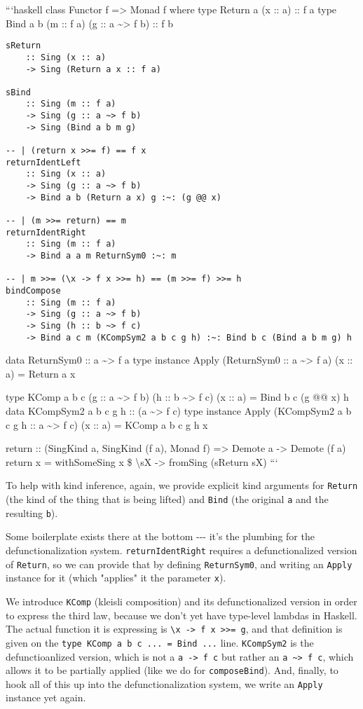 \documentclass[]{article}
\begin{document}
```haskell class Functor f =\textgreater{} Monad f where type Return a (x :: a)
:: f a type Bind a b (m :: f a) (g :: a \textasciitilde{}\textgreater{} f b) ::
f b

\begin{verbatim}
sReturn
    :: Sing (x :: a)
    -> Sing (Return a x :: f a)

sBind
    :: Sing (m :: f a)
    -> Sing (g :: a ~> f b)
    -> Sing (Bind a b m g)

-- | (return x >>= f) == f x
returnIdentLeft
    :: Sing (x :: a)
    -> Sing (g :: a ~> f b)
    -> Bind a b (Return a x) g :~: (g @@ x)

-- | (m >>= return) == m
returnIdentRight
    :: Sing (m :: f a)
    -> Bind a a m ReturnSym0 :~: m

-- | m >>= (\x -> f x >>= h) == (m >>= f) >>= h
bindCompose
    :: Sing (m :: f a)
    -> Sing (g :: a ~> f b)
    -> Sing (h :: b ~> f c)
    -> Bind a c m (KCompSym2 a b c g h) :~: Bind b c (Bind a b m g) h
\end{verbatim}

data ReturnSym0 :: a \textasciitilde{}\textgreater{} f a type instance Apply
(ReturnSym0 :: a \textasciitilde{}\textgreater{} f a) (x :: a) = Return a x

type KComp a b c (g :: a \textasciitilde{}\textgreater{} f b) (h :: b
\textasciitilde{}\textgreater{} f c) (x :: a) = Bind b c (g @@ x) h data
KCompSym2 a b c g h :: (a \textasciitilde{}\textgreater{} f c) type instance
Apply (KCompSym2 a b c g h :: a \textasciitilde{}\textgreater{} f c) (x :: a) =
KComp a b c g h x

return :: (SingKind a, SingKind (f a), Monad f) =\textgreater{} Demote a
-\textgreater{} Demote (f a) return x = withSomeSing x \$ \textbackslash{}sX
-\textgreater{} fromSing (sReturn sX) ```

To help with kind inference, again, we provide explicit kind arguments for
\texttt{Return} (the kind of the thing that is being lifted) and \texttt{Bind}
(the original \texttt{a} and the resulting \texttt{b}).

Some boilerplate exists there at the bottom -\/-\/- it's the plumbing for the
defunctionalization system. \texttt{returnIdentRight} requires a
defunctionalized version of \texttt{Return}, so we can provide that by defining
\texttt{ReturnSym0}, and writing an \texttt{Apply} instance for it (which
"applies" it the parameter \texttt{x}).

We introduce \texttt{KComp} (kleisli composition) and its defunctionalized
version in order to express the third law, because we don't yet have type-level
lambdas in Haskell. The actual function it is expressing is
\texttt{\textbackslash{}x\ -\textgreater{}\ f\ x\ \textgreater{}\textgreater{}=\ g},
and that definition is given on the
\texttt{type\ KComp\ a\ b\ c\ ...\ =\ Bind\ ...} line. \texttt{KCompSym2} is the
defunctioanlized version, which is not a \texttt{a\ -\textgreater{}\ f\ c} but
rather an \texttt{a\ \textasciitilde{}\textgreater{}\ f\ c}, which allows it to
be partially applied (like we do for \texttt{composeBind}). And, finally, to
hook all of this up into the defunctionalization system, we write an
\texttt{Apply} instance yet again.
\end{document}
